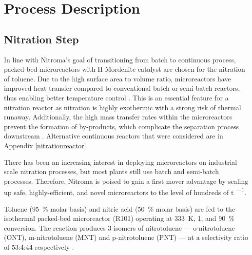 \section{Process Description}
\label{sec:process}
\subsection{Nitration Step}
In line with Nitroma's goal of transitioning from batch to continuous process, packed-bed microreactors with H-Mordenite catalyst are chosen for the nitration of toluene. Due to the high surface area to volume ratio, microreactors have improved heat transfer compared to conventional batch or semi-batch reactors, thus enabling better temperature control \cite{halder_nitration_2007}. This is an essential feature for a nitration reactor as nitration is highly exothermic with a strong risk of thermal runaway. Additionally, the high mass transfer rates within the microreactors prevent the formation of by-products, which complicate the separation process downstream \cite{halder_nitration_2007}.
Alternative continuous reactors that were considered are in Appendix \ref{nitrationreactor}. 

There has been an increasing interest in deploying microreactors on industrial scale nitration processes, but most plants still use batch and semi-batch processes. Therefore, Nitroma is poised to gain a first mover advantage by scaling up safe, highly-efficient, and novel microreactors to the level of hundreds of \si{\tonne\per\year}.

Toluene (\SI{95}{\percent} molar basis) and nitric acid (\SI{50}{\percent} molar basis) are fed to the isothermal packed-bed microreactor (R101) operating at \SI{333}{\K}, \SI{1}{\atm}, and \SI{90}{\percent} conversion. The reaction produces 3 isomers of nitrotoluene --- o-nitrotoluene (ONT), m-nitrotoluene (MNT) and p-nitrotoluene (PNT) --- at a selectivity ratio of 53:4:44 respectively \cite{smith_novel_1998}.


